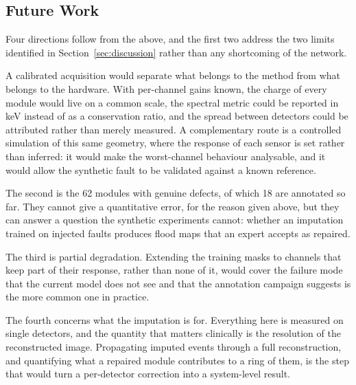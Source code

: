 \documentclass[10pt,conference]{IEEEtran}
\begin{document}
\subsection{Future Work}

Four directions follow from the above, and the first two address the two
limits identified in Section~\ref{sec:discussion} rather than any shortcoming of
the network.

A calibrated acquisition would separate what belongs to the method from what
belongs to the hardware. With per-channel gains known, the charge of every
module would live on a common scale, the spectral metric could be reported in
keV instead of as a conservation ratio, and the spread between detectors could
be attributed rather than merely measured. A complementary route is a
controlled simulation of this same geometry, where the response of each sensor
is set rather than inferred: it would make the worst-channel behaviour
analysable, and it would allow the synthetic fault to be validated against a
known reference.

The second is the 62 modules with genuine defects, of which 18 are annotated so
far. They cannot give a quantitative error, for the reason given above, but
they can answer a question the synthetic experiments cannot: whether an
imputation trained on injected faults produces flood maps that an expert
accepts as repaired.

The third is partial degradation. Extending the training masks to channels that
keep part of their response, rather than none of it, would cover the failure
mode that the current model does not see and that the annotation campaign
suggests is the more common one in practice.

The fourth concerns what the imputation is for. Everything here is measured on
single detectors, and the quantity that matters clinically is the resolution of
the reconstructed image. Propagating imputed events through a full
reconstruction, and quantifying what a repaired module contributes to a ring of
them, is the step that would turn a per-detector correction into a
system-level result.


\end{document}
